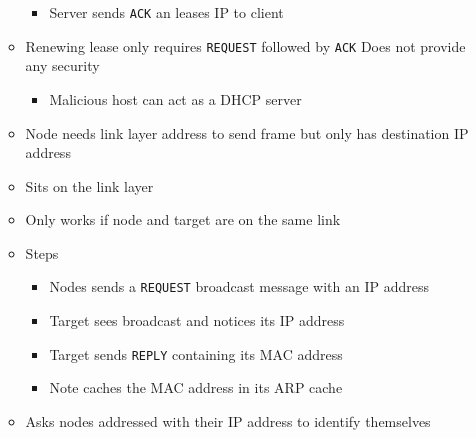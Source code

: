 \begin{itemize}
\begin{itemize}
\begin{itemize}
                     \item Server sends \verb+ACK+ an leases IP to client
                \end{itemize}
            \item Renewing lease only requires \verb+REQUEST+ followed by \verb+ACK+
            \icon Does not provide any security
                \begin{itemize}
                    \item Malicious host can act as a DHCP server
                \end{itemize}
        \end{itemize}
        \begin{itemize}
            \item Node needs link layer address to send frame but only has destination IP address
            \item Sits on the link layer
            \item Only works if node and target are on the same link
            \item Steps
                \begin{itemize}
                    \item Nodes sends a \verb+REQUEST+ broadcast message with an IP address
                    \item Target sees broadcast and notices its IP address
                    \item Target sends \verb+REPLY+ containing its MAC address
                    \item Note caches the MAC address in its ARP cache
                \end{itemize}
            \item Asks nodes addressed with their IP address to identify themselves
        \end{itemize}
\end{itemize}


